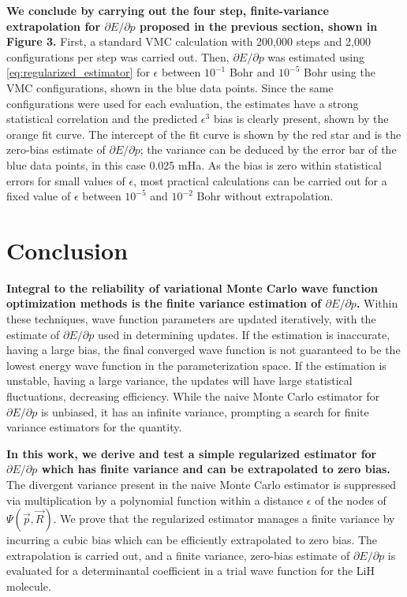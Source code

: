 \documentclass{article}
\begin{document}
\textbf{We conclude by carrying out the four step, finite-variance extrapolation for $\partial E/\partial p$ proposed in the previous section, shown in Figure 3.}
First, a standard VMC calculation with 200,000 steps and 2,000 configurations per step was carried out.
Then, $\partial E/\partial p$ was estimated using \eqref{eq:regularized_estimator} for $\epsilon$ between $10^{-1}$ Bohr and $10^{-5}$ Bohr using the VMC configurations, shown in the blue data points.
Since the same configurations were used for each evaluation, the estimates have a strong statistical correlation and the predicted $\epsilon^3$ bias is clearly present, shown by the orange fit curve.
The intercept of the fit curve is shown by the red star and is the zero-bias estimate of $\partial E/\partial p$; the variance can be deduced by the error bar of the blue data points, in this case 0.025 mHa.
As the bias is zero within statistical errors for small values of $\epsilon$, most practical calculations can be carried out for a fixed value of $\epsilon$ between $10^{-5}$ and $10^{-2}$ Bohr without extrapolation.

\section{Conclusion}
\textbf{Integral to the reliability of variational Monte Carlo wave function optimization methods is the finite variance estimation of $\partial E/\partial p$.}
Within these techniques, wave function parameters are updated iteratively, with the estimate of $\partial E/\partial p$ used in determining updates.
If the estimation is inaccurate, having a large bias, the final converged wave function is not guaranteed to be the lowest energy wave function in the parameterization space.
If the estimation is unstable, having a large variance, the updates will have large statistical fluctuations, decreasing efficiency.
While the naive Monte Carlo estimator for $\partial E/\partial p$ is unbiased, it has an infinite variance, prompting a search for finite variance estimators for the quantity.

\textbf{In this work, we derive and test a simple regularized estimator for $\partial E/\partial p$ which has finite variance and can be extrapolated to zero bias.}
The divergent variance present in the naive Monte Carlo estimator is suppressed via multiplication by a polynomial function within a distance $\epsilon$ of the nodes of $\Psi(\vec{p}, \vec{R})$. 
We prove that the regularized estimator manages a finite variance by incurring a cubic bias which can be efficiently extrapolated to zero bias.
The extrapolation is carried out, and a finite variance, zero-bias estimate of $\partial E/\partial p$ is evaluated for a determinantal coefficient in a trial wave function for the LiH molecule.
\end{document}
